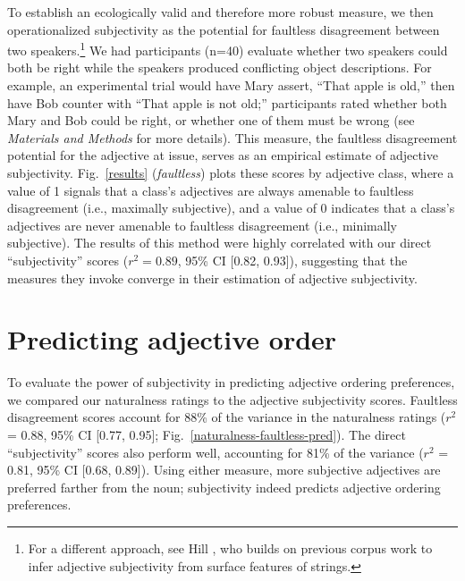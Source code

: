 \documentclass{pnastwo}
\begin{document}
\begin{article}
 To establish an ecologically valid and therefore more robust measure, we then operationalized subjectivity as the potential for faultless disagreement between two speakers.\footnote{For a different approach, see Hill \cite{hill2012}, who builds on previous corpus work \cite{wulff2003} to infer adjective subjectivity from surface features of strings.} We had participants (n=40) evaluate whether two speakers could both be right while the speakers produced conflicting object descriptions. For example, an experimental trial would have Mary assert, ``That apple is old,'' then have Bob counter with ``That apple is not old;'' 
participants rated whether both Mary and Bob could be right, or whether one of them must be wrong (see \emph{Materials and Methods} for more details). This measure, the faultless disagreement potential for the adjective at issue, serves as an empirical estimate of adjective subjectivity. 
Fig.\ \ref{results} (\emph{faultless}) plots these scores by adjective class, where a value of 1 signals that a class's adjectives are always amenable to faultless disagreement (i.e., maximally subjective), and a value of 0 indicates that a class's adjectives are never amenable to faultless disagreement (i.e., minimally subjective).
The results of this method were highly correlated with our direct ``subjectivity'' scores ($r^{2} = 0.89$, 95\% CI [0.82, 0.93]), suggesting that the measures they invoke converge in their estimation of adjective subjectivity. %

\section{Predicting adjective order}

To evaluate the power of subjectivity in predicting adjective ordering preferences, we compared our naturalness ratings to the adjective subjectivity scores.
Faultless disagreement scores account for  88\% of the variance in the naturalness ratings ($r^2$ = 0.88, 95\% CI [0.77, 0.95]; Fig.~\ref{naturalness-faultless-pred}).
The direct ``subjectivity'' scores also perform well, accounting for 81\% of the variance ($r^2$ = 0.81, 95\% CI [0.68, 0.89]).
Using either measure, more subjective adjectives are preferred farther from the noun; subjectivity indeed predicts adjective ordering preferences.


\end{article}
\end{document}
